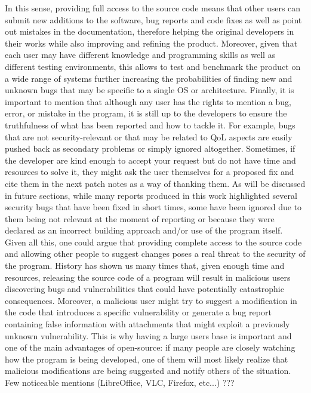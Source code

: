 \newline
In this sense, providing full access to the source code means that other users can submit new additions to the software, bug reports and code fixes as well as point out mistakes in the documentation, therefore helping the original developers in their works while also improving and refining the product. Moreover, given that each user may have different knowledge and programming skills as well as different testing environments, this allows to test and benchmark the product on a wide range of systems further increasing the probabilities of finding new and unknown bugs that may be specific to a single OS or architecture.
\newline \newline
Finally, it is important to mention that although any user has the rights to mention a bug, error, or mistake in the program, it is still up to the developers to ensure the truthfulness of what has been reported and how to tackle it.
\newline
For example, bugs that are not security-relevant or that may be related to QoL aspects are easily pushed back as secondary problems or simply ignored altogether.
Sometimes, if the developer are kind enough to accept your request but do not have time and resources to solve it, they might ask the user themselves for a proposed fix and cite them in the next patch notes as a way of thanking them.
\newline \newline
As will be discussed in future sections, while many reports produced in this work highlighted several security bugs that have been fixed in short times, some have been ignored due to them being not relevant at the moment of reporting or because they were declared as an incorrect building approach and/or use of the program itself.   
\newline \newline \newline
Given all this, one could argue that providing complete access to the source code and allowing other people to suggest changes poses a real threat to the security of the program.
\newline
History has shown us many times that, given enough time and resources, releasing the source code of a program will result in malicious users discovering bugs and vulnerabilities that could have potentially catastrophic consequences. Moreover, a malicious user might try to suggest a modification in the code that introduces a specific vulnerability or generate a bug report containing false information with attachments that might exploit a previously unknown vulnerability.
\newline
This is why having a large users base is important and one of the main advantages of open-source: if many people are closely watching how the program is being developed, one of them will most likely realize that malicious modifications are being suggested and notify others of the situation.
\newline \newline
Few noticeable mentions (LibreOffice, VLC, Firefox, etc...) ???




